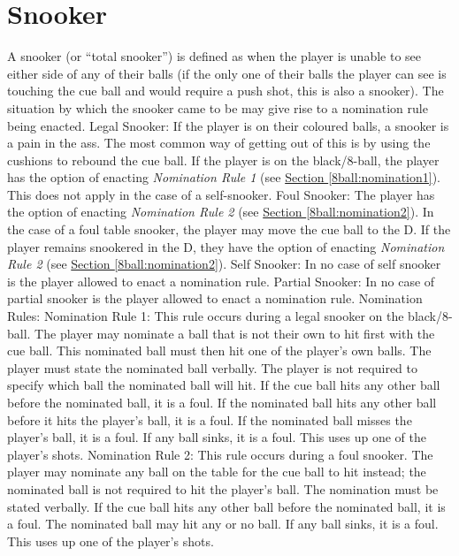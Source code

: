 \section{Snooker} \label{8ball:snooker}

 A snooker (or “total snooker”) is defined as when the player is unable to see either side of any of their balls (if the only one of their balls the player can see is touching the cue ball and would require a push shot, this is also a snooker). The situation by which the snooker came to be may give rise to a nomination rule being enacted.%
 Legal Snooker:%
\subruleitem If the player is on their coloured balls, a snooker is a pain in the ass. The most common way of getting out of this is by using the cushions to rebound the cue ball.%
\subruleitem If the player is on the black/8-ball, the player has the option of enacting \emph{Nomination Rule 1} (see \hyperref[8ball:nomination1]{Section \ref*{8ball:nomination1}}). This does not apply in the case of a self-snooker.%
 Foul Snooker:%
\subruleitem The player has the option of enacting \emph{Nomination Rule 2} (see \hyperref[8ball:nomination2]{Section \ref*{8ball:nomination2}}).%
\subruleitem In the case of a foul table snooker, the player may move the cue ball to the D. If the player remains snookered in the D, they have the option of enacting \emph{Nomination Rule 2} (see \hyperref[8ball:nomination2]{Section \ref*{8ball:nomination2}}).%
 Self Snooker: In no case of self snooker is the player allowed to enact a nomination rule.%
 Partial Snooker: In no case of partial snooker is the player allowed to enact a nomination rule.%
 Nomination Rules:%
\subruleitem\label{8ball:nomination1}Nomination Rule 1: This rule occurs during a legal snooker on the black/8-ball. The player may nominate a ball that is not their own to hit first with the cue ball. This nominated ball must then hit one of the player's own balls. The player must state the nominated ball verbally. The player is not required to specify which ball the nominated ball will hit. If the cue ball hits any other ball before the nominated ball, it is a foul. If the nominated ball hits any other ball before it hits the player's ball, it is a foul. If the nominated ball misses the player's ball, it is a foul. If any ball sinks, it is a foul. This uses up one of the player's shots.%
\subruleitem\label{8ball:nomination2}Nomination Rule 2: This rule occurs during a foul snooker. The player may nominate any ball on the table for the cue ball to hit instead; the nominated ball is not required to hit the player's ball. The nomination must be stated verbally. If the cue ball hits any other ball before the nominated ball, it is a foul. The nominated ball may hit any or no ball. If any ball sinks, it is a foul. This uses up one of the player's shots.%

